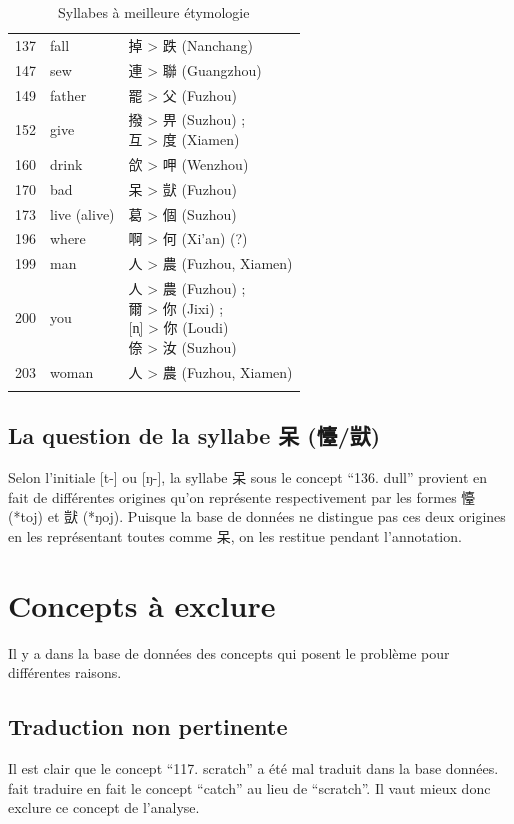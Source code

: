 \documentclass{scrbook}
\newcounter{c}[subsubsection]
\begin{document}
\begin{sloppypar}
\begin{longtable}[htbp]{lll}
    137   & fall  & 掉 > 跌 (Nanchang) \\
    147   & sew   & 連 > 聯 (Guangzhou) \\
    149   & father & 罷 > 父 (Fuzhou) \\
    152   & give  & \makecell[l]{撥 > 畀 (Suzhou) ; \\互 > 度 (Xiamen)} \\
    160   & drink & 欱 > 呷 (Wenzhou) \\
    170   & bad   & 呆 > 獃 (Fuzhou) \\
    173   & live (alive) & 葛 > 個 (Suzhou) \\
    196   & where & 啊 > 何 (Xi'an) (?) \\
    199   & man   & 人 > 農 (Fuzhou, Xiamen) \\
    200   & you   & \makecell[l]{人 > 農 (Fuzhou) ; \\爾 > 你 (Jixi) ; \\{[n̩]} > 你 (Loudi) \\ 倷 > 汝 (Suzhou)} \\
    203   & woman & 人 > 農 (Fuzhou, Xiamen) \\
    \bottomrule
  \caption{Syllabes à meilleure étymologie}
  \label{tab:meilleure_etym}%
\end{longtable}%

\subsection{La question de la syllabe 呆 (懛/獃)}
Selon l'initiale [t-] ou [ŋ-], la syllabe 呆 sous le concept ``136. dull'' provient en fait de différentes origines qu'on représente respectivement par les formes 懛 (*toj) et 獃 (*ŋoj). Puisque la base de données ne distingue pas ces deux origines en les représentant toutes comme 呆, on les restitue pendant l'annotation.

\section{Concepts à exclure}\label{concept_excl}
Il y a dans la base de données des concepts qui posent le problème pour différentes raisons.

\subsection{Traduction non pertinente}
Il est clair que le concept ``117. scratch'' a été mal traduit dans la base données. \textcite[129]{Liu2007hexinci} fait traduire en fait le concept ``catch'' au lieu de ``scratch''. Il vaut mieux donc exclure ce concept de l'analyse.


\end{sloppypar}
\end{document}
